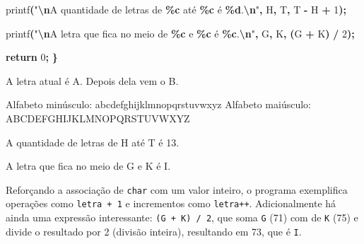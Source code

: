 \documentclass[
  11pt,
  a4paper,
]{scrbook}
\newenvironment{Shaded}{\begin{snugshade}}{\end{snugshade}}
\newcommand{\CharTok}[1]{\textcolor[rgb]{0.31,0.60,0.02}{#1}}
\newcommand{\ControlFlowTok}[1]{\textcolor[rgb]{0.13,0.29,0.53}{\textbf{#1}}}
\newcommand{\DecValTok}[1]{\textcolor[rgb]{0.00,0.00,0.81}{#1}}
\newcommand{\NormalTok}[1]{#1}
\newcommand{\OperatorTok}[1]{\textcolor[rgb]{0.81,0.36,0.00}{\textbf{#1}}}
\newcommand{\SpecialCharTok}[1]{\textcolor[rgb]{0.81,0.36,0.00}{\textbf{#1}}}
\newcommand{\StringTok}[1]{\textcolor[rgb]{0.31,0.60,0.02}{#1}}
\begin{document}
\begin{Shaded}
\begin{Highlighting}[]
\NormalTok{    printf}\OperatorTok{(}\StringTok{"}\SpecialCharTok{\textbackslash{}n}\StringTok{A quantidade de letras de }\SpecialCharTok{\%c}\StringTok{ até }\SpecialCharTok{\%c}\StringTok{ é }\SpecialCharTok{\%d}\StringTok{.}\SpecialCharTok{\textbackslash{}n}\StringTok{"}\OperatorTok{,}
           \CharTok{\textquotesingle{}H\textquotesingle{}}\OperatorTok{,} \CharTok{\textquotesingle{}T\textquotesingle{}}\OperatorTok{,} \CharTok{\textquotesingle{}T\textquotesingle{}} \OperatorTok{{-}} \CharTok{\textquotesingle{}H\textquotesingle{}} \OperatorTok{+} \DecValTok{1}\OperatorTok{);}

\NormalTok{    printf}\OperatorTok{(}\StringTok{"}\SpecialCharTok{\textbackslash{}n}\StringTok{A letra que fica no meio de }\SpecialCharTok{\%c}\StringTok{ e }\SpecialCharTok{\%c}\StringTok{ é }\SpecialCharTok{\%c}\StringTok{.}\SpecialCharTok{\textbackslash{}n}\StringTok{"}\OperatorTok{,}
           \CharTok{\textquotesingle{}G\textquotesingle{}}\OperatorTok{,} \CharTok{\textquotesingle{}K\textquotesingle{}}\OperatorTok{,} \OperatorTok{(}\CharTok{\textquotesingle{}G\textquotesingle{}} \OperatorTok{+} \CharTok{\textquotesingle{}K\textquotesingle{}}\OperatorTok{)} \OperatorTok{/} \DecValTok{2}\OperatorTok{);}

    \ControlFlowTok{return} \DecValTok{0}\OperatorTok{;}
\OperatorTok{\}}
\end{Highlighting}
\end{Shaded}

\begin{Shaded}
\begin{Highlighting}[]
\NormalTok{A letra atual é A. Depois dela vem o B.}

\NormalTok{Alfabeto minúsculo: abcdefghijklmnopqrstuvwxyz}
\NormalTok{Alfabeto maiúsculo: ABCDEFGHIJKLMNOPQRSTUVWXYZ}

\NormalTok{A quantidade de letras de H até T é 13.}

\NormalTok{A letra que fica no meio de G e K é I.}
\end{Highlighting}
\end{Shaded}

Reforçando a associação de \texttt{char} com um valor inteiro, o
programa exemplifica operações como \texttt{letra\ +\ 1} e incrementos
como \texttt{letra++}. Adicionalmente há ainda uma expressão
interessante:
\texttt{(\textquotesingle{}G\textquotesingle{}\ +\ \textquotesingle{}K\textquotesingle{})\ /\ 2},
que soma \texttt{\textquotesingle{}G\textquotesingle{}} (71) com de
\texttt{\textquotesingle{}K\textquotesingle{}} (75) e divide o resultado
por 2 (divisão inteira), resultando em 73, que é
\texttt{\textquotesingle{}I\textquotesingle{}}.
\end{document}
